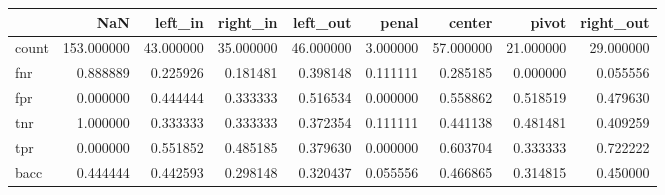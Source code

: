 \begin{tabular}{lrrrrrrrr}
\toprule
{} &         NaN &    left\_in &   right\_in &   left\_out &     penal &     center &      pivot &  right\_out \\
\midrule
count &  153.000000 &  43.000000 &  35.000000 &  46.000000 &  3.000000 &  57.000000 &  21.000000 &  29.000000 \\
fnr   &    0.888889 &   0.225926 &   0.181481 &   0.398148 &  0.111111 &   0.285185 &   0.000000 &   0.055556 \\
fpr   &    0.000000 &   0.444444 &   0.333333 &   0.516534 &  0.000000 &   0.558862 &   0.518519 &   0.479630 \\
tnr   &    1.000000 &   0.333333 &   0.333333 &   0.372354 &  0.111111 &   0.441138 &   0.481481 &   0.409259 \\
tpr   &    0.000000 &   0.551852 &   0.485185 &   0.379630 &  0.000000 &   0.603704 &   0.333333 &   0.722222 \\
bacc  &    0.444444 &   0.442593 &   0.298148 &   0.320437 &  0.055556 &   0.466865 &   0.314815 &   0.450000 \\
\bottomrule
\end{tabular}
